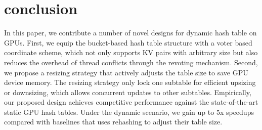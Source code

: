\section{conclusion}\label{sec:con}
In this paper, we contribute a number of novel designs for dynamic hash table on GPUs. 
First, we equip the bucket-based hash table structure with a voter based coordinate scheme, 
which not only supports KV pairs with arbitrary size but also reduces the overhead of thread conflicts through the revoting mechanism. 
Second, we propose a resizing strategy that actively adjusts the table size to save GPU device memory. The resizing strategy only lock one subtable for efficient upsizing or downsizing, which allows concurrent updates to other subtables. Empirically, our proposed design achieves competitive performance against the state-of-the-art static GPU hash tables. Under the dynamic scenario, we gain up to 5x speedups compared with baselines that uses rehashing to adjust their table size. 

 